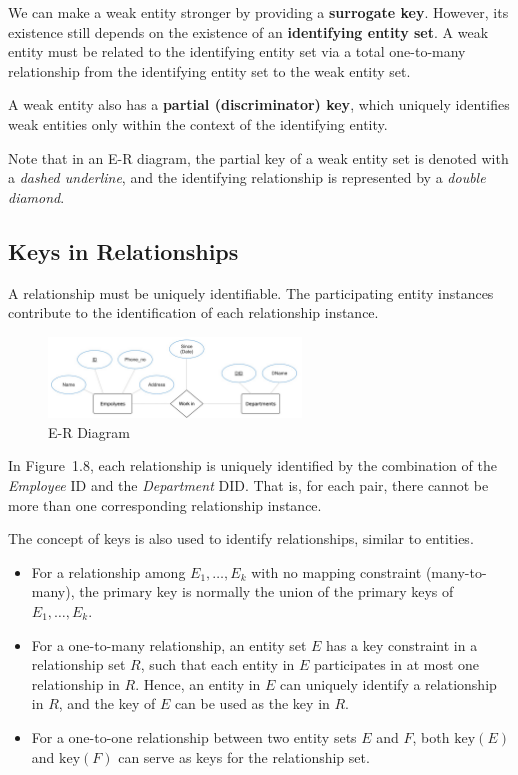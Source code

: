 We can make a weak entity stronger by providing a \textbf{surrogate key}. However, its existence still depends on the existence of an \textbf{identifying entity set}. A weak entity must be related to the identifying entity set via a total one-to-many relationship from the identifying entity set to the weak entity set.  

A weak entity also has a \textbf{partial (discriminator) key}, which uniquely identifies weak entities only within the context of the identifying entity.  

Note that in an E-R diagram, the partial key of a weak entity set is denoted with a \emph{dashed underline}, and the identifying relationship is represented by a \emph{double diamond}.

\subsection{Keys in Relationships}
A relationship must be uniquely identifiable. The participating entity instances contribute to the identification of each relationship instance.  

\begin{figure}[H]
  \centering
  \includegraphics[width=0.6\textwidth]{Figure/ER2.pdf}
  \caption{E-R Diagram}
\end{figure}

In Figure~1.8, each relationship is uniquely identified by the combination of the \emph{Employee} ID and the \emph{Department} DID. That is, for each pair, there cannot be more than one corresponding relationship instance.  

The concept of keys is also used to identify relationships, similar to entities.  

\begin{itemize}
  \item For a relationship among \(E_1, \dots, E_k\) with no mapping constraint (many-to-many), the primary key is normally the union of the primary keys of \(E_1, \dots, E_k\).  
  \item For a one-to-many relationship, an entity set \(E\) has a key constraint in a relationship set \(R\), such that each entity in \(E\) participates in at most one relationship in \(R\). Hence, an entity in \(E\) can uniquely identify a relationship in \(R\), and the key of \(E\) can be used as the key in \(R\).  
  \item For a one-to-one relationship between two entity sets \(E\) and \(F\), both \(\text{key}(E)\) and \(\text{key}(F)\) can serve as keys for the relationship set.
\end{itemize}

